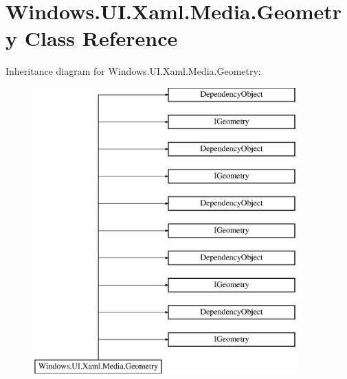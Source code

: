 \hypertarget{class_windows_1_1_u_i_1_1_xaml_1_1_media_1_1_geometry}{}\section{Windows.\+U\+I.\+Xaml.\+Media.\+Geometry Class Reference}
\label{class_windows_1_1_u_i_1_1_xaml_1_1_media_1_1_geometry}
Inheritance diagram for Windows.\+U\+I.\+Xaml.\+Media.\+Geometry\+:\begin{figure}[H]
\begin{center}
\leavevmode
\includegraphics[height=11.000000cm]{class_windows_1_1_u_i_1_1_xaml_1_1_media_1_1_geometry}
\end{center}
\end{figure}
